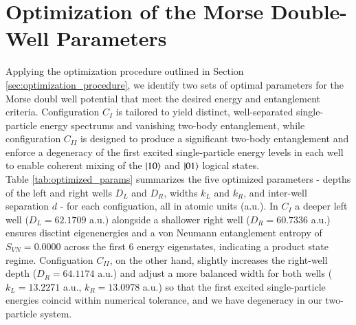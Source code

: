 \documentclass{subfiles}
\begin{document}
\section{Optimization of the Morse Double-Well Parameters}\label{sec:optimization_result}
Applying the optimization procedure outlined in Section \ref{sec:optimization_procedure}, we identify two sets of optimal parameters for the Morse doubl well potential that meet the desired energy and entanglement criteria. Configuration $C_I$ is tailored to yield distinct, well-separated single-particle energy spectrums and vanishing two-body entanglement, while configuration $C_{II}$ is designed to produce a significant two-body entanglement and enforce a degeneracy of the first excited single-particle energy levels in each well to enable coherent mixing of the $\ket{10}$ and $\ket{01}$ logical states.
\\ 

Table \ref{tab:optimized_params} summarizes the five optimized parameters - depths of the left and right wells $D_L$ and $D_R$, widths $k_L$ and $k_R$, and inter-well separation $d$ -  for each configuation, all in atomic units (a.u.). In $C_I$ a deeper left well ($D_L = 62.1709$ a.u.) alongside a shallower right well ($D_R = 60.7336$ a.u.) ensures disctint eigenenergies and a von Neumann entanglement entropy of $S_{VN} = 0.0000$ across the first 6 energy eigenstates, indicating a product state regime. Configuation $C_{II}$, on the other hand, slightly increases the right-well depth ($D_R = 64.1174$ a.u.) and adjust a more balanced width for both wells ($k_L = 13.2271$ a.u., $k_R = 13.0978$ a.u.) so that the first excited single-particle energies coincid within numerical tolerance, and we have degeneracy in our two-particle system.
\end{document}
